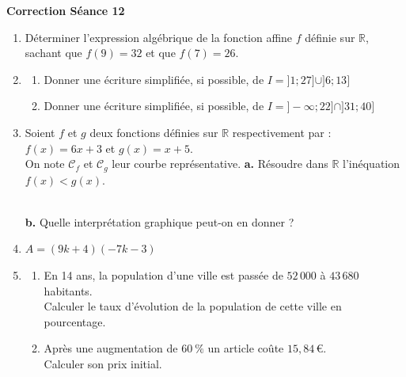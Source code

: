 \documentclass[a4paper,11pt]{article}
\begin{document}
\begin{center}

\textbf{\textcolor{Couleur8}{Correction Séance 12}}\\
\vspace{2mm}

\end{center}

\newpage

\begin{seanceD}{} %
\begin{enumerate}
\item  Déterminer l'expression algébrique de la fonction affine $f$ définie sur $\mathbb R$, sachant que  $f(9)=32$ et que $f(7)=26$.\dotfill

\dotfill

\dotfill

\item \begin{enumerate}
	\item \begin{minipage}[t]{\linewidth} Donner une écriture simplifiée, si possible, de $I=]1;27]\cup]6;13]$ \dotfill \end{minipage}
	\item \begin{minipage}[t]{\linewidth} Donner une écriture simplifiée, si possible, de $I=]-\infty;22]\cap]31;40]$ \dotfill \end{minipage}
\end{enumerate}


\item  Soient $f$ et $g$ deux fonctions définies sur $\mathbb R$ respectivement par : $f(x)=6x+3$ et $g(x)=x+5$. \\
              On note $\mathscr{C}_f$ et $\mathscr{C}_g$ leur courbe représentative. \textbf {a.}  Résoudre dans $\mathbb R$ l'inéquation $f(x) < g(x)$.
              
              \dotfill
              
              \dotfill
              
              \dotfill \\
          \textbf {b.}  Quelle interprétation graphique peut-on en donner ? \dotfill


\item $A = (9k+4)(-7k-3)$\dotfill


\item \begin{enumerate}
	\item En 14 ans, la population d'une ville est passée de $52\,000$ à $43\,680$ habitants. \\
                Calculer le taux d'évolution de la population de cette ville en pourcentage. 
       \dotfill
	\item Après une augmentation de $60~\%$ un article coûte $15{,}84$\,\euro{}. \\ Calculer son prix initial.
	

\end{enumerate}
\end{enumerate}
\end{seanceD}
\end{document}
